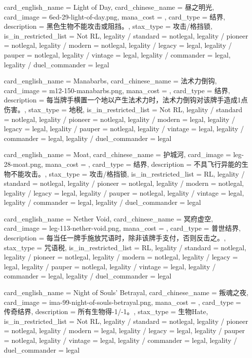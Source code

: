 \documentclass[lang = cn, color = black, 10pt]{AllThatStax}
\begin{document}
\card
{
	card_english_name = {Light of Day},
	card_chinese_name = {昼之明光},
	card_image = 6ed-29-light-of-day.png,
	mana_cost = ,
	card_type = 结界,
	description = {黑色生物不能攻击或阻挡。},
	stax_type = 攻击/格挡锁,
	is_in_restricted_list = Not RL,
	legality / standard = notlegal,
	legality / pioneer = notlegal,
	legality / modern = notlegal,
	legality / legacy = legal,
	legality / pauper = notlegal,
	legality / vintage = legal,
	legality / commander = legal,
	legality / duel_commander = legal
}

\card
{
	card_english_name = {Manabarbs},
	card_chinese_name = {法术力倒钩},
	card_image = m12-150-manabarbs.png,
	mana_cost = ,
	card_type = 结界,
	description = {每当牌手横置一个地以产生法术力时，法术力倒钩对该牌手造成1点伤害。},
	stax_type = 地税,
	is_in_restricted_list = Not RL,
	legality / standard = notlegal,
	legality / pioneer = notlegal,
	legality / modern = legal,
	legality / legacy = legal,
	legality / pauper = notlegal,
	legality / vintage = legal,
	legality / commander = legal,
	legality / duel_commander = legal
}

\card
{
	card_english_name = {Moat},
	card_chinese_name = {护城河},
	card_image = leg-28-moat.png,
	mana_cost = ,
	card_type = 结界,
	description = {不具飞行异能的生物不能攻击。},
	stax_type = 攻击/格挡锁,
	is_in_restricted_list = RL,
	legality / standard = notlegal,
	legality / pioneer = notlegal,
	legality / modern = notlegal,
	legality / legacy = legal,
	legality / pauper = notlegal,
	legality / vintage = legal,
	legality / commander = legal,
	legality / duel_commander = legal
}

\card
{
	card_english_name = {Nether Void},
	card_chinese_name = {冥府虚空},
	card_image = leg-113-nether-void.png,
	mana_cost = ,
	card_type = 普世结界,
	description = {每当任一牌手施放咒语时，除非该牌手支付，否则反击之。},
	stax_type = 咒语税,
	is_in_restricted_list = RL,
	legality / standard = notlegal,
	legality / pioneer = notlegal,
	legality / modern = notlegal,
	legality / legacy = legal,
	legality / pauper = notlegal,
	legality / vintage = legal,
	legality / commander = legal,
	legality / duel_commander = legal
}

\card
{
	card_english_name = {Night of Souls' Betrayal},
	card_chinese_name = {叛魂之夜},
	card_image = ima-99-night-of-souls-betrayal.png,
	mana_cost = ,
	card_type = 传奇结界,
	description = {所有生物得-1/-1。},
	stax_type = 生物Hate,
	is_in_restricted_list = Not RL,
	legality / standard = notlegal,
	legality / pioneer = notlegal,
	legality / modern = legal,
	legality / legacy = legal,
	legality / pauper = notlegal,
	legality / vintage = legal,
	legality / commander = legal,
	legality / duel_commander = legal
}
\end{document}
